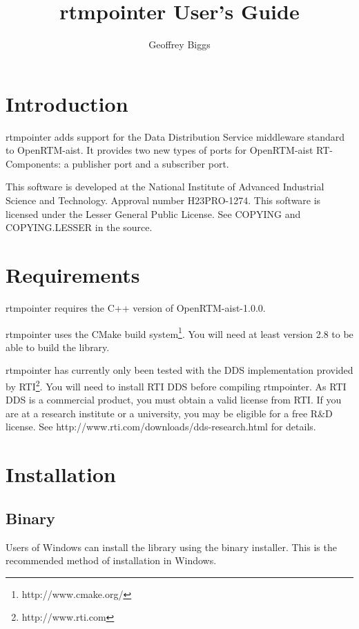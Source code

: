 \documentclass[a4paper,10pt]{article}
\title{rtmpointer User's Guide}
\author{Geoffrey Biggs}
\begin{document}
\maketitle

\section{Introduction}
\label{sec:intro}

rtmpointer adds support for the Data Distribution Service middleware
standard to OpenRTM-aist. It provides two new types of ports for
OpenRTM-aist RT-Components: a publisher port and a subscriber port.

This software is developed at the National Institute of Advanced Industrial
Science and Technology. Approval number H23PRO-1274. This software is licensed
under the Lesser General Public License. See COPYING and COPYING.LESSER in the
source.

\section{Requirements}
\label{sec:requirements}

rtmpointer requires the C++ version of OpenRTM-aist-1.0.0.

rtmpointer uses the CMake build system\footnote{http://www.cmake.org/}. You
will need at least version 2.8 to be able to build the library.

rtmpointer has currently only been tested with the DDS implementation
provided by RTI\footnote{http://www.rti.com}. You will need to install
RTI DDS before compiling rtmpointer. As RTI DDS is a commercial product, you
must obtain a valid license from RTI. If you are at a research institute
or a university, you may be eligible for a free R\&D license. See
http://www.rti.com/downloads/dds-research.html for details.

\section{Installation}
\label{sec:installation}

\subsection{Binary}

Users of Windows can install the library using the binary installer.
This is the recommended method of installation in Windows.
\end{document}
